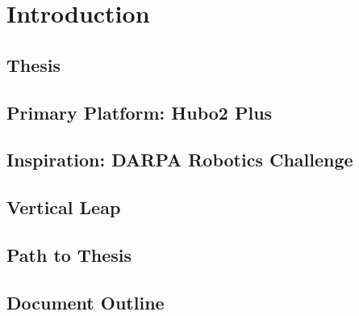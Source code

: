\chapter{Introduction}
	\section{Thesis} %
		
	\section{Primary Platform: Hubo2 Plus}\label{sec:hubo}
			
	\section{Inspiration: DARPA Robotics Challenge}\label{sec:drc}
    		
    \section{Vertical Leap}
		
	\section{Path to Thesis}	
			
	\section{Document Outline} 
	
			
